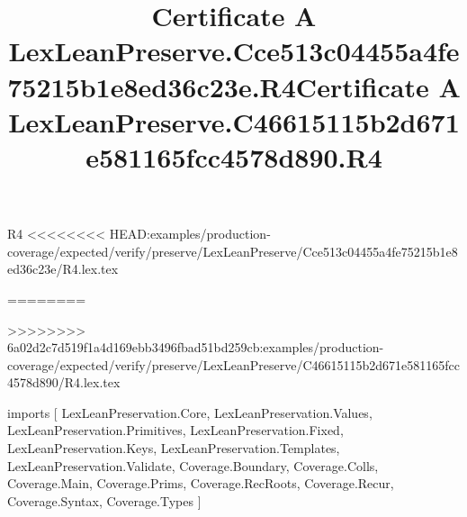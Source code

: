 \begin{lexlean}{R4}
<<<<<<<< HEAD:examples/production-coverage/expected/verify/preserve/LexLeanPreserve/Cce513c04455a4fe75215b1e8ed36c23e/R4.lex.tex
\title{Certificate A LexLeanPreserve.Cce513c04455a4fe75215b1e8ed36c23e.R4}
========
\title{Certificate A LexLeanPreserve.C46615115b2d671e581165fcc4578d890.R4}
>>>>>>>> 6a02d2c7d519f1a4d169ebb3496fbad51bd259cb:examples/production-coverage/expected/verify/preserve/LexLeanPreserve/C46615115b2d671e581165fcc4578d890/R4.lex.tex
\begin{coremodule}
imports [
  LexLeanPreservation.Core,
  LexLeanPreservation.Values,
  LexLeanPreservation.Primitives,
  LexLeanPreservation.Fixed,
  LexLeanPreservation.Keys,
  LexLeanPreservation.Templates,
  LexLeanPreservation.Validate,
  Coverage.Boundary,
  Coverage.Colls,
  Coverage.Main,
  Coverage.Prims,
  Coverage.RecRoots,
  Coverage.Recur,
  Coverage.Syntax,
  Coverage.Types
]


\end{coremodule}
\end{lexlean}
